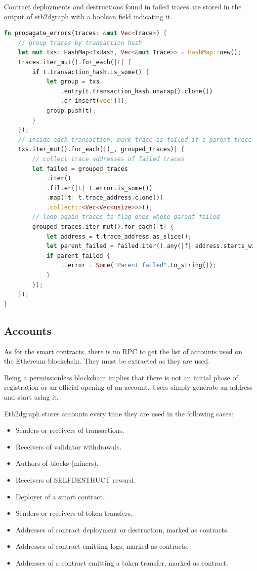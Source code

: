 Contract deployments and destructions found in failed traces are stored in the output of eth2dgraph with a boolean field indicating it.

\begin{lstlisting}[language=Rust,caption={Algorithm for errors propagation in traces.},label={lst:error-propagation},captionpos=b, style=boxed]
fn propagate_errors(traces: &mut Vec<Trace>) {
    // group traces by transaction hash
    let mut txs: HashMap<TxHash, Vec<&mut Trace>> = HashMap::new();
    traces.iter_mut().for_each(|t| {
        if t.transaction_hash.is_some() {
            let group = txs
                .entry(t.transaction_hash.unwrap().clone())
                .or_insert(vec![]);
            group.push(t);
        }
    });
    // inside each transaction, mark trace as failed if a parent trace has failed
    txs.iter_mut().for_each(|(_, grouped_traces)| {
        // collect trace addresses of failed traces
        let failed = grouped_traces
            .iter()
            .filter(|t| t.error.is_some())
            .map(|t| t.trace_address.clone())
            .collect::<Vec<Vec<usize>>>();
        // loop again traces to flag ones whose parent failed
        grouped_traces.iter_mut().for_each(|t| {
            let address = t.trace_address.as_slice();
            let parent_failed = failed.iter().any(|f| address.starts_with(f));
            if parent_failed {
                t.error = Some("Parent failed".to_string());
            }
        });
    });
}
\end{lstlisting}

\subsection{Accounts}

As for the smart contracts, there is no RPC to get the list of accounts used on the Ethereum blockchain. They must be extracted as they are used.

Being a permissionless blockchain implies that there is not an initial phase of registration or an official opening of an account. Users simply generate an address and start using it. 

Eth2dgraph stores accounts every time they are used in the following cases:

\begin{itemize}
    \item Senders or receivers of transactions.
    \item Receivers of validator withdrawals.
    \item Authors of blocks (miners).
    \item Receivers of SELFDESTRUCT reward.
    \item Deployer of a smart contract.
    \item Senders or receivers of token transfers.
    \item Addresses of contract deployment or destruction, marked as contracts.
    \item Addresses of contract emitting logs, marked as contracts.
    \item Addresses of a contract emitting a token transfer, marked as contract.
\end{itemize}

